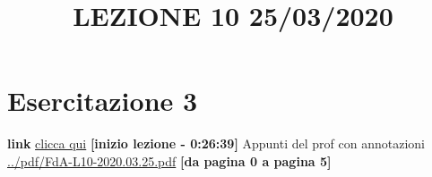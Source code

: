 \section{Esercitazione 3}
\title{LEZIONE 10 25/03/2020}\newline
\textbf{link} \href{https://web.microsoftstream.com/video/562a82e0-19cc-4f81-9183-eee77c9c45a4?list=user&userId=faa91214-a6f5-40d7-8875-253fd49b8ce1}{clicca qui} \;\;\textbf{[inizio lezione - 0:26:39]}\newline
\newline
Appunti del prof con annotazioni \url{../pdf/FdA-L10-2020.03.25.pdf} \textbf{[da pagina 0 a pagina 5]}